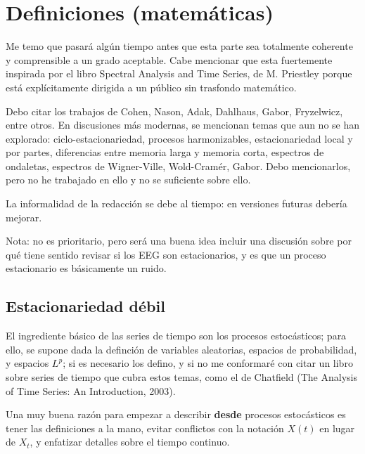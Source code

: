 
\chapter{Definiciones (matem\'aticas)}

Me temo que pasar\'a alg\'un tiempo antes que esta parte sea totalmente coherente
y comprensible a un grado aceptable. Cabe mencionar
que esta fuertemente inspirada por el libro Spectral Analysis and Time Series, 
de M. Priestley \cite{Priestley81} porque est\'a expl\'icitamente dirigida a un p\'ublico 
sin trasfondo matem\'atico.

Debo citar los trabajos de Cohen, Nason, Adak, Dahlhaus, Gabor, Fryzelwicz, entre otros.
En discusiones m\'as modernas, se mencionan temas que aun no se han explorado:
ciclo-estacionariedad, procesos harmonizables, estacionariedad local y por partes,
diferencias entre memoria larga y memoria corta, espectros de ondaletas, espectros de
Wigner-Ville, Wold-Cram\'er, Gabor. 
Debo mencionarlos, pero no he trabajado en ello y no se suficiente sobre ello.

La informalidad de la redacci\'on se debe al tiempo: en versiones futuras deber\'ia mejorar.

Nota: no es prioritario, pero ser\'a una buena idea incluir una discusi\'on sobre por qu\'e
tiene sentido revisar si los EEG son estacionarios, y es que un proceso estacionario es 
b\'asicamente un ruido.


\section{Estacionariedad d\'ebil}

El ingrediente b\'asico de las series de tiempo son los procesos estoc\'asticos; para ello, se
supone dada la definci\'on de variables aleatorias, espacios de probabilidad, y espacios $L^{p}$;
si es necesario los defino, y si no me conformar\'e con citar un libro sobre series de tiempo
que cubra estos temas,
como el de Chatfield (The Analysis of Time Series: An Introduction, 2003).

Una muy buena raz\'on para empezar a describir \textbf{desde} procesos estoc\'asticos es tener
las definiciones a la mano, evitar conflictos con la notaci\'on $X(t)$ en lugar de $X_t$, y
enfatizar detalles sobre el tiempo continuo.

